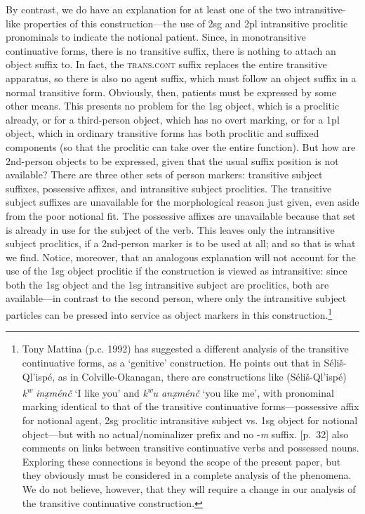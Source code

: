 \documentclass[output=paper,colorlinks,citecolor=brown]{langscibook}
\begin{document}
By contrast, we do have an explanation for at least one of the two
intransitive-like properties of this construction---the use of 2sg and
2pl intransitive proclitic pronominals to indicate the notional
patient.  Since, in monotransitive continuative forms, there is no
transitive suffix, there is nothing to attach an object suffix to.  In
fact, the \textsc{trans.cont} suffix replaces the entire transitive
apparatus, so there is also no agent suffix, which must follow an
object suffix in a normal transitive form.  Obviously, then, patients
must be expressed by some other means.  This presents no problem for
the 1sg object, which is a proclitic already, or for a third-person
object, which has no overt marking, or for a 1pl object, which in
ordinary transitive forms has both proclitic and suffixed components
(so that the proclitic can take over the entire function).  But how
are 2nd-person objects to be expressed, given that the usual suffix
position is not available?  There are three other sets of person
markers: transitive subject suffixes, possessive affixes, and
intransitive subject proclitics.  The transitive subject suffixes are
unavailable for the morphological reason just given, even aside from
the poor notional fit.  The possessive affixes are unavailable because
that set is already in use for the subject of the verb.  This leaves
only the intransitive subject proclitics, if a 2nd-person marker is to
be used at all; and so that is what we find.  Notice, moreover, that
an analogous explanation will not account for the use of the 1sg
object proclitic if the construction is viewed as intransitive: since
both the 1sg object and the 1sg intransitive subject are proclitics,
both are available---in contrast to the second person, where only the
intransitive subject particles can be pressed into service as object
markers in this construction.\footnote{Tony Mattina (p.c. 1992) has
suggested a different analysis of the transitive continuative forms,
as a `genitive' construction.  He points out that in
S\'eli\v{s}-Ql'isp\'e, as in Colville-Okanagan, there are
constructions like (S\'eli\v{s}-Ql'isp\'e) \emph{{k\textsuperscript w}
in\d{x}m\'en\v{c}} `I like you' and \emph{{k\textsuperscript w}u
an\d{x}m\'en\v{c}} `you like me', with pronominal marking identical to
that of the transitive continuative forms---possessive affix for
notional agent, 2sg proclitic intransitive subject vs. 1sg object for
notional object---but with no actual/nominalizer prefix and no
-\emph{m} suffix.  \cite{Vogt:1940}[p.~32] also comments on links
between transitive continuative verbs and possessed nouns.  Exploring
these connections is beyond the scope of the present paper, but they
obviously must be considered in a complete analysis of the phenomena.
We do not believe, however, that they will require a change in our
analysis of the transitive continuative construction.  }
\end{document}
